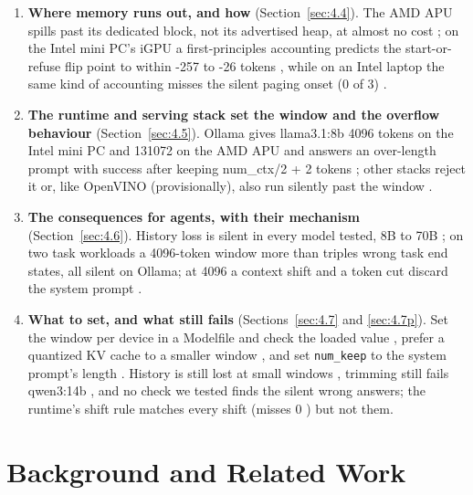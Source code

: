 \documentclass[conference,10pt]{IEEEtran}
\begin{document}
\begin{enumerate}

\item \textbf{Where memory runs out, and how} (Section~\ref{sec:4.4}). The AMD APU spills past its dedicated block, not its advertised heap, at almost no cost%
; on the Intel mini PC's iGPU a first-principles accounting predicts the start-or-refuse flip point to within -257 to -26 tokens%
, while on an Intel laptop the same kind of accounting misses the silent paging onset (0 of 3)%
.

\item \textbf{The runtime and serving stack set the window and the overflow behaviour} (Section~\ref{sec:4.5}). Ollama gives llama3.1:8b 4096 tokens on the Intel mini PC and 131072 on the AMD APU %
and answers an over-length prompt with success after keeping num\_ctx/2 + 2 tokens%
; other stacks reject it or, like OpenVINO (provisionally), also run silently past the window%
.

\item \textbf{The consequences for agents, with their mechanism} (Section~\ref{sec:4.6}). History loss is silent in every model tested, 8B to 70B%
; on two task workloads a 4096-token window more than triples wrong task end states, all silent on Ollama; at 4096 a context shift and a token cut discard the system prompt%
.

\item \textbf{What to set, and what still fails} (Sections~\ref{sec:4.7} and \ref{sec:4.7p}). Set the window per device in a Modelfile and check the loaded value%
, prefer a quantized KV cache to a smaller window%
, and set \texttt{num\_keep} to the system prompt's length%
. History is still lost at small windows%
, trimming still fails qwen3:14b%
, and no check we tested finds the silent wrong answers; the runtime's shift rule matches every shift (misses 0%
) but not them.

\end{enumerate}

\section{Background and Related Work}\label{sec:4.2}
\end{document}
